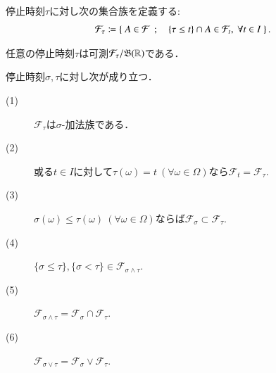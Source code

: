 	\begin{screen}
		\begin{dfn}[停止時刻で定まる事象]
			停止時刻$\tau$に対し次の集合族を定義する:
			\begin{align}
				\mathcal{F}_\tau \coloneqq \left\{\ A \in \mathcal{F}\ \, ; \quad \{ \tau \leq t \} \cap A \in \mathcal{F}_t,\ \forall t \in I\ \right\}.
			\end{align}
		\end{dfn}
	\end{screen}
	
	\begin{screen}
		\begin{thm}
			任意の停止時刻$\tau$は可測$\mathcal{F}_\tau/\mathfrak{B}(\mathbb{R})$である．
		\end{thm}
	\end{screen}
	
	
	\begin{screen}
		\begin{prp}[停止時刻の性質]
			停止時刻$\sigma, \tau$に対し次が成り立つ．
			\begin{description}
				\item[(1)] $\mathcal{F}_\tau$は$\sigma$-加法族である．
				\item[(2)] 或る$t \in I$に対して$\tau(\omega) = t\ (\forall \omega \in \Omega)$なら$\mathcal{F}_t = \mathcal{F}_\tau$.
				\item[(3)] $\sigma(\omega) \leq \tau(\omega)\ (\forall \omega \in \Omega)$ならば$\mathcal{F}_\sigma \subset \mathcal{F}_\tau$.
				\item[(4)] $\{\sigma \leq \tau\},\{\sigma < \tau\} \in \mathcal{F}_{\sigma \wedge \tau}$.
				\item[(5)] $\mathcal{F}_{\sigma \wedge \tau} = \mathcal{F}_\sigma \cap \mathcal{F}_\tau$.
				\item[(6)] $\mathcal{F}_{\sigma \vee \tau} = \mathcal{F}_\sigma \vee \mathcal{F}_\tau$.
			\end{description}
			\label{prp:properties_of_stopping_times}
		\end{prp}
	\end{screen}
	
